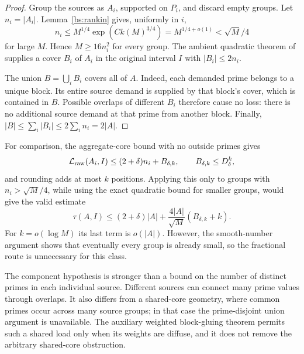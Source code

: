 \begin{proof}
Group the sources as $A_i$, supported on $P_i$, and discard empty
groups. Let $n_i=|A_i|$. Lemma~\ref{bs:rankin} gives, uniformly in $i$,
\[
 n_i\le M^{1/4}\exp(Ck(M)^{3/4})
      =M^{1/4+o(1)}<\sqrt M/4
\]
for large $M$. Hence $M\ge16n_i^2$ for every group.
The ambient quadratic theorem of \cite{Wang} supplies a cover $B_i$
of $A_i$ in the original interval $I$ with $|B_i|\le2n_i$.

The union $B=\bigcup_iB_i$ covers all of $A$.
Indeed, each demanded prime belongs to a unique block. Its entire
source demand is supplied by that block's cover, which is contained
in $B$. Possible overlaps of different $B_i$ therefore cause no loss:
there is no additional source demand at that prime from another
block. Finally,
$|B|\le\sum_i|B_i|\le2\sum_i n_i=2|A|$.
\end{proof}

For comparison, the aggregate-core bound with no outside primes gives
\[
 \mathcal L_{\rm raw}(A_i,I)
 \le(2+\delta)n_i+B_{\delta,k},\qquad
 B_{\delta,k}\le D_\delta^k,
\]
and rounding adds at most $k$ positions. Applying this only to groups
with $n_i>\sqrt M/4$, while using the exact quadratic bound for smaller
groups, would give the valid estimate
\[
 \tau(A,I)\le(2+\delta)|A|
       +\frac{4|A|}{\sqrt M}(B_{\delta,k}+k).
\]
For $k=o(\log M)$ its last term is $o(|A|)$.
However, the smooth-number argument shows that eventually every group
is already small, so the fractional route is unnecessary for this class.

The component hypothesis is stronger than a bound on the number of
distinct primes in each individual source. Different sources can connect
many prime values through overlaps. It also differs from a shared-core
geometry, where common primes occur across many source groups; in that
case the prime-disjoint union argument is unavailable.
The auxiliary weighted block-gluing theorem permits such a shared load
only when its weights are diffuse, and it does not remove the arbitrary
shared-core obstruction.
